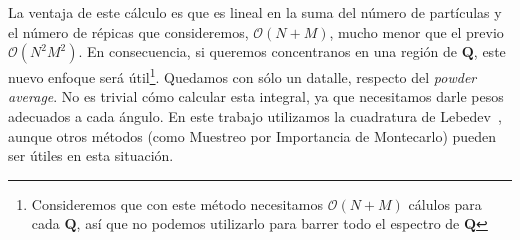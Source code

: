 La ventaja de este cálculo es que es lineal en la suma del número de partículas y el número de répicas que consideremos, $\mathcal{O}(N+M)$, mucho menor que el previo $\mathcal{O}(N^2M^2)$.
En consecuencia, si queremos concentranos en una región de $\mathbf{Q}$, este nuevo enfoque será útil\footnote{Consideremos que con este método necesitamos $\mathcal{O}(N+M)$ cálulos para cada $\mathbf{Q}$, así que no podemos utilizarlo para barrer todo el espectro de $\mathbf{Q}$}.
Quedamos con sólo un datalle, respecto del \emph{powder average}.
No es trivial cómo calcular esta integral, ya que necesitamos darle pesos adecuados a cada ángulo.
En este trabajo utilizamos la cuadratura de Lebedev~\cite{lebedev_values_1975}, aunque otros métodos (como Muestreo por Importancia de Montecarlo) pueden ser útiles en esta situación.